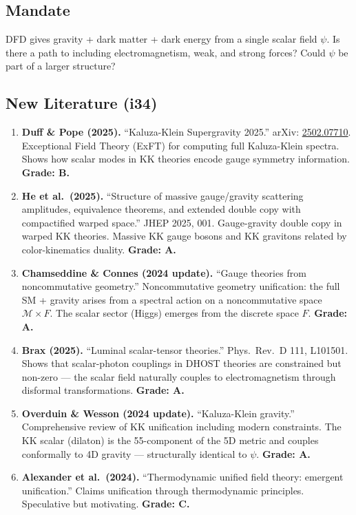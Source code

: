 \documentclass[11pt,a4paper]{article}
\begin{document}
\subsection{Mandate}

DFD gives gravity + dark matter + dark energy from a single scalar field $\psi$. Is there a path to including electromagnetism, weak, and strong forces? Could $\psi$ be part of a larger structure?

\subsection{New Literature (i34)}

\begin{enumerate}
\item \textbf{Duff \& Pope (2025).} ``Kaluza-Klein Supergravity 2025.'' arXiv: \href{https://arxiv.org/abs/2502.07710}{2502.07710}. Exceptional Field Theory (ExFT) for computing full Kaluza-Klein spectra. Shows how scalar modes in KK theories encode gauge symmetry information. \textbf{Grade: B.}

\item \textbf{He et al.\ (2025).} ``Structure of massive gauge/gravity scattering amplitudes, equivalence theorems, and extended double copy with compactified warped space.'' JHEP 2025, 001. Gauge-gravity double copy in warped KK theories. Massive KK gauge bosons and KK gravitons related by color-kinematics duality. \textbf{Grade: A.}

\item \textbf{Chamseddine \& Connes (2024 update).} ``Gauge theories from noncommutative geometry.'' Noncommutative geometry unification: the full SM + gravity arises from a spectral action on a noncommutative space $\mathcal{M} \times F$. The scalar sector (Higgs) emerges from the discrete space $F$. \textbf{Grade: A.}

\item \textbf{Brax (2025).} ``Luminal scalar-tensor theories.'' Phys.\ Rev.\ D 111, L101501. Shows that scalar-photon couplings in DHOST theories are constrained but non-zero --- the scalar field naturally couples to electromagnetism through disformal transformations. \textbf{Grade: A.}

\item \textbf{Overduin \& Wesson (2024 update).} ``Kaluza-Klein gravity.'' Comprehensive review of KK unification including modern constraints. The KK scalar (dilaton) is the 55-component of the 5D metric and couples conformally to 4D gravity --- structurally identical to $\psi$. \textbf{Grade: A.}

\item \textbf{Alexander et al.\ (2024).} ``Thermodynamic unified field theory: emergent unification.'' Claims unification through thermodynamic principles. Speculative but motivating. \textbf{Grade: C.}
\end{enumerate}
\end{document}
